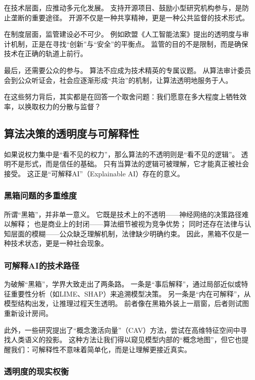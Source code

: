 在技术层面，应推动多元化发展。
支持开源项目、鼓励小型研究机构参与，是防止垄断的重要途径。
开源不仅是一种共享精神，更是一种公共监督的技术形式。

在制度层面，监管建设必不可少。
例如欧盟《人工智能法案》提出的透明度与审计机制，正是在寻找“创新”与“安全”的平衡点。
监管的目的不是限制，而是确保技术在正确的轨道上前行。

最后，还需要公众的参与。
算法不应成为技术精英的专属议题。
从算法审计委员会到公众听证会，社会应逐渐形成“共治”的机制，让算法透明地服务于人。

在这些努力背后，其实都是在回答一个取舍问题：我们愿意在多大程度上牺牲效率，以换取权力的分散与监督？

\subsection{算法决策的透明度与可解释性}

如果说权力集中是“看不见的权力”，那么算法的不透明则是“看不见的逻辑”。
透明不是形式，而是信任的基础。
只有当算法的逻辑可被理解，它才能真正被社会接受。
这正是“可解释AI”（Explainable AI）存在的意义。

\subsubsection{黑箱问题的多重维度}

所谓“黑箱”，并非单一意义。
它既是技术上的不透明——神经网络的决策路径难以解释；
也是商业上的封闭——算法细节被视为竞争优势；
同时还存在法律与认知层面的模糊——公众缺乏理解机制，法律缺少明确约束。
因此，黑箱不仅是一种技术状态，更是一种社会现象。

\subsubsection{可解释AI的技术路径}

为破解“黑箱”，学界大致走出了两条路。
一条是“事后解释”，通过局部近似或特征重要性分析（如LIME、SHAP）来追溯模型决策。
另一条是“内在可解释”，从模型结构出发，让推理过程天生透明。
前者像在黑箱外装上一扇窗，后者则试图重新设计房间。

此外，一些研究提出了“概念激活向量”（CAV）方法，尝试在高维特征空间中寻找人类语义的投影。
这种方法让我们得以窥见模型内部的“概念地图”，但它也提醒我们：可解释性不意味着简单化，而是让理解更接近真实。

\subsubsection{透明度的现实权衡}

